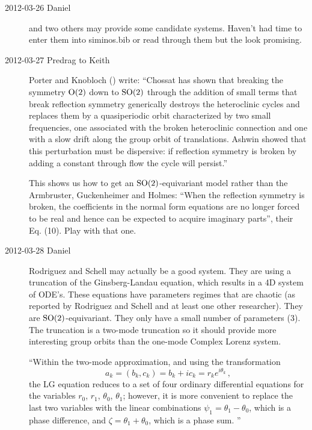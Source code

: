 \begin{description}
\item[2012-03-26 Daniel]  and two others may provide some
candidate systems. Haven't had time to enter them into siminos.bib or
read through them but the look promising.

\item[2012-03-27 Predrag to Keith]
Porter and Knobloch
()
write: ``Chossat has shown that breaking the symmetry
$\textrm{O}(2)$ down to $\textrm{SO}(2)$ through the addition of small terms that break
reflection symmetry generically destroys the heteroclinic cycles and
replaces them by a quasiperiodic orbit characterized by two small
frequencies, one associated with the broken heteroclinic connection and
one with a slow drift along the group orbit of translations. Ashwin
\etal{} showed that this perturbation must be dispersive: if
reflection symmetry is broken by adding a constant through flow the cycle
will persist.''

This shows us how to get an $\textrm{SO}(2)$-equivariant model rather than
the Armbruster, Guckenheimer and Holmes:
``When the reflection symmetry is broken, the coefficients in the normal
form equations are no longer forced to be real and hence can be expected
to acquire imaginary parts'', their Eq. (10). Play with that one.

\item[2012-03-28 Daniel]
Rodriguez and Schell may actually be a good system.
They are using a truncation of the Ginsberg-Landau equation, which
results in a 4D system of ODE's. These equations have parameters regimes
that are chaotic (as reported by Rodriguez and Schell and at least one
other researcher). They are $\textrm{SO}(2)$-equivariant. They only have a small
number of parameters (3). The truncation is a two-mode truncation so it
should provide more interesting group orbits than the one-mode Complex
Lorenz system.

``Within the two-mode approximation, and using
the transformation
\[ a_k = (b_k, c_k) = b_k + ic_k = r_k e^{i\theta_k}\,, \]
the LG equation reduces
to a set of four ordinary differential equations
for the variables $r_0$, $r_1$, $\theta_0$, $\theta_1$; however, it is more convenient
to replace the last two variables with the linear
combinations $\psi_1 = \theta_1 -\theta_0$, which is a phase
difference, and $\zeta = \theta_1 +\theta_0$, which is a phase sum.
''

\end{description}
